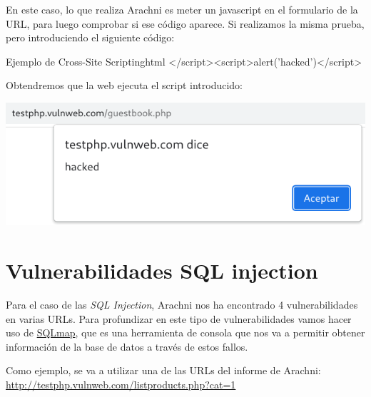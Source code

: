 \documentclass{\ClassPath/viu-tfm-template}
\begin{document}
En este caso, lo que realiza Arachni es meter un javascript en el formulario de la URL, para luego comprobar si ese código aparece. Si realizamos la misma prueba, pero introduciendo el siguiente código:

\begin{mycode}{Ejemplo de Cross-Site Scripting}{html}{}
</script><script>alert('hacked')</script>
\end{mycode}

Obtendremos que la web ejecuta el script introducido:

\vspace{15pt}
\begin{center}
    \vspace{-20pt}
    \includegraphics[width=0.7\linewidth]{img/ejemplo_xss.png}
\end{center}



\chapter{Vulnerabilidades SQL injection}
Para el caso de las \textit{SQL Injection}, Arachni nos ha encontrado 4 vulnerabilidades en varias URLs. Para profundizar en este tipo de vulnerabilidades vamos hacer uso de \href{https://sqlmap.org/}{SQLmap}, que es una herramienta de consola que nos va a permitir obtener información de la base de datos a través de estos fallos.

Como ejemplo, se va a utilizar una de las URLs del informe de Arachni: \href{http://testphp.vulnweb.com/listproducts.php?cat=1}{http://testphp.vulnweb.com/listproducts.php?cat=1}

\end{document}
